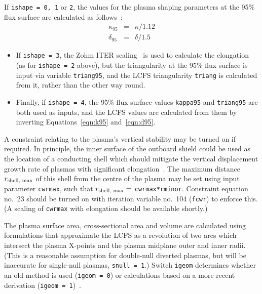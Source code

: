 \documentclass[11pt,a4paper]{report}
\begin{document}
If \texttt{ishape = 0, 1} or \texttt{2}, the values for the plasma shaping
parameters at the 95\% flux surface are calculated as
follows~\cite{DEMOPhysicsGuidelines}:
\begin{eqnarray}
\kappa_{95} & = & \kappa / 1.12 \label{eqn:k95} \\
\delta_{95} & = & \delta / 1.5 \label{eqn:d95}
\end{eqnarray}

\begin{itemize}

\item If \texttt{ishape = 3}, the Zohm ITER scaling~\cite{Zohm} is used to
  calculate the elongation (as for \texttt{ishape = 2} above), but the
  triangularity at the 95\% flux surface is input via variable
  \texttt{triang95}, and the LCFS triangularity \texttt{triang} is calculated
  from it, rather than the other way round.

\item Finally, if \texttt{ishape = 4}, the 95\% flux surface values
  \texttt{kappa95} and \texttt{triang95} are both used as inputs, and the LCFS
  values are calculated from them by inverting Equations~\ref{eqn:k95} and~\ref{eqn:d95}.

\end{itemize}

A constraint relating to the plasma's vertical stability may be turned on if
required. In principle, the inner surface of the outboard shield could be used
as the location of a conducting shell which should mitigate the vertical
displacement growth rate of plasmas with significant
elongation~\cite{Sakamoto}. The maximum distance $r_{\mbox{\scriptsize shell,
  max}}$ of this shell from the centre of the plasma may be set using input
parameter \texttt{cwrmax}, such that $r_{\mbox{\scriptsize shell, max}} = $
\texttt{cwrmax*rminor}. Constraint equation no.\ 23 should be turned on with
iteration variable no.\ 104 (\texttt{fcwr}) to enforce this. (A scaling of
\texttt{cwrmax} with elongation should be available shortly.)

The plasma surface area, cross-sectional area and volume are calculated using
formulations that approximate the LCFS as a revolution of two arcs which
intersect the plasma X-points and the plasma midplane outer and inner
radii. (This is a reasonable assumption for double-null diverted plasmas, but
will be inaccurate for single-null plasmas, \texttt{snull = 1}.) Switch
\texttt{igeom} determines whether an old method is used (\texttt{igeom = 0})
or calculations based on a more recent derivation (\texttt{igeom =
  1})~\cite{logbook14_41}.
\end{document}
